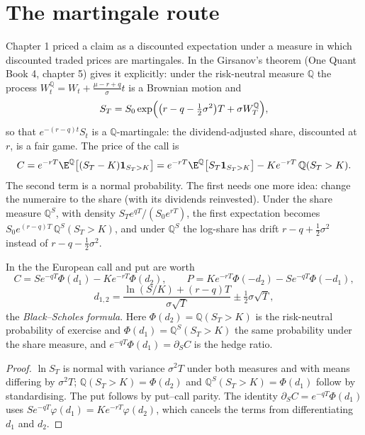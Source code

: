 \section{The martingale route}

Chapter 1 priced a claim as a discounted expectation under a measure in which
discounted traded prices are martingales. In the  Girsanov's
theorem (One Quant Book 4, chapter 5) gives it explicitly: under the
risk-neutral measure $\mathbb Q$ the process $W^{\mathbb Q}_t=W_t+\frac{\mu-r+q}
{\sigma}t$ is a Brownian motion and
\[
S_T=S_0\exp\Bigl(\bigl(r-q-\tfrac12\sigma^2\bigr)T+\sigma W^{\mathbb Q}_T\Bigr),
\]
so that $e^{-(r-q)t}S_t$ is a $\mathbb Q$-martingale: the dividend-adjusted share,
discounted at $r$, is a fair game. The price of the call is
\[
C=e^{-rT}\E^{\mathbb Q}\bigl[(S_T-K)\mathbf 1_{S_T>K}\bigr]
=e^{-rT}\E^{\mathbb Q}\bigl[S_T\mathbf 1_{S_T>K}\bigr]-Ke^{-rT}\,\mathbb Q(S_T>K).
\]
The second term is a normal probability. The first needs one more idea: change
the numeraire to the share (with its dividends reinvested). Under the share
measure $\mathbb Q^S$, with density $S_Te^{qT}/(S_0e^{rT})$, the first expectation
becomes $S_0e^{(r-q)T}\,\mathbb Q^S(S_T>K)$, and under $\mathbb Q^S$ the log-share
has drift $r-q+\tfrac12\sigma^2$ instead of $r-q-\tfrac12\sigma^2$.

\begin{theorem}\label{thm:dv:black-scholes-three-ways:formula}
In the  the European call and put are worth
\[
C=Se^{-qT}\Phi(d_1)-Ke^{-rT}\Phi(d_2),\qquad
P=Ke^{-rT}\Phi(-d_2)-Se^{-qT}\Phi(-d_1),
\]
\[
d_{1,2}=\frac{\ln(S/K)+(r-q)T}{\sigma\sqrt T}\pm\tfrac12\sigma\sqrt T,
\]
the \emph{Black--Scholes formula}. Here
$\Phi(d_2)=\mathbb Q(S_T>K)$ is the risk-neutral probability of exercise and
$\Phi(d_1)=\mathbb Q^S(S_T>K)$ the same probability under the share measure, and
$e^{-qT}\Phi(d_1)=\partial_SC$ is the hedge ratio.
\end{theorem}
\begin{proof}
$\ln S_T$ is normal with variance $\sigma^2T$ under both measures and with means
differing by $\sigma^2T$; $\mathbb Q(S_T>K)=\Phi(d_2)$ and $\mathbb Q^S(S_T>K)=
\Phi(d_1)$ follow by standardising. The put follows by put--call parity. The
identity $\partial_SC=e^{-qT}\Phi(d_1)$ uses $S e^{-qT}\varphi(d_1)=Ke^{-rT}
\varphi(d_2)$, which cancels the terms from differentiating $d_1$ and $d_2$.
\end{proof}

